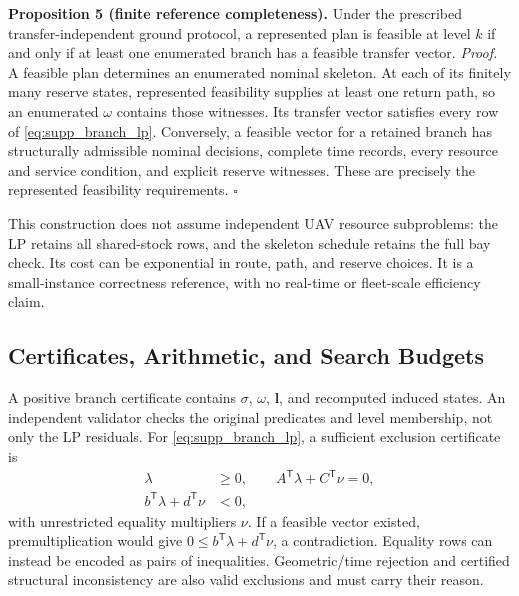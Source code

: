 \medskip
\noindent\textbf{Proposition 5 (finite reference completeness).}
Under the prescribed transfer-independent ground protocol, a represented
plan is feasible at level $k$ if and only if at least one enumerated
branch has a feasible transfer vector.
\emph{Proof.}
A feasible plan determines an enumerated nominal skeleton. At each of its
finitely many reserve states, represented feasibility supplies at least
one return path, so an enumerated $\omega$ contains those witnesses.
Its transfer vector satisfies every row of \eqref{eq:supp_branch_lp}.
Conversely, a feasible vector for a retained branch has structurally
admissible nominal decisions, complete time records, every resource and
service condition, and explicit reserve witnesses. These are precisely
the represented feasibility requirements. \hfill$\square$

This construction does not assume independent UAV resource subproblems:
the LP retains all shared-stock rows, and the skeleton schedule retains
the full bay check. Its cost can be exponential in route, path, and reserve
choices. It is a small-instance correctness reference, with no real-time
or fleet-scale efficiency claim.

\subsection{Certificates, Arithmetic, and Search Budgets}
\label{subsec:recovery_certification}

A positive branch certificate contains $\sigma$, $\omega$, $\mathbf l$,
and recomputed induced states. An independent validator checks the
original predicates and level membership, not only the LP residuals.
For \eqref{eq:supp_branch_lp}, a sufficient exclusion certificate is
\begin{equation}
\begin{split}
\lambda&\ge0,\qquad A^{\mathsf T}\lambda+C^{\mathsf T}\nu=0,\\
b^{\mathsf T}\lambda+d^{\mathsf T}\nu&<0,
\end{split}
\label{eq:branch_exclusion_certificate}
\end{equation}
with unrestricted equality multipliers $\nu$. If a feasible vector
existed, premultiplication would give
$0\le b^{\mathsf T}\lambda+d^{\mathsf T}\nu$, a contradiction.
Equality rows can instead be encoded as pairs of inequalities.
Geometric/time rejection and certified structural inconsistency are also
valid exclusions and must carry their reason.

